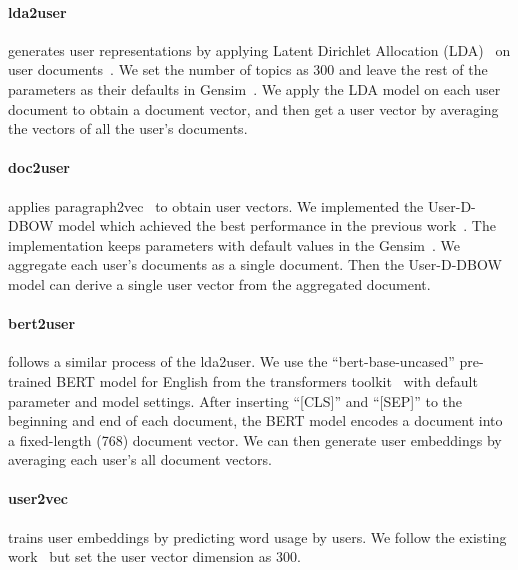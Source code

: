 \paragraph{lda2user} 
generates user representations by applying Latent Dirichlet Allocation (LDA)~\cite{blei2003latent} on user documents~\cite{pennacchiotti2011machine}. We set the number of topics as 300 and leave the rest of the parameters as their defaults in  Gensim~\cite{rehurek2010software}. We apply the LDA model on each user document to obtain a document vector, and then get a user vector by averaging the vectors of all the user's documents.


\paragraph{doc2user} 
applies paragraph2vec~\cite{le2014distributed} to obtain user vectors. We implemented the User-D-DBOW model which achieved the best performance in the previous work~\cite{ding2017multi}. The implementation keeps parameters with default values in the Gensim~\cite{rehurek2010software}. We aggregate each user's documents as a single document. Then the User-D-DBOW model can derive a single user vector from the aggregated document.

\paragraph{bert2user} 
follows a similar process of the lda2user. We use the ``bert-base-uncased'' pre-trained BERT model
for English from the transformers toolkit~\cite{Wolf2019HuggingFacesTS} with default parameter and model settings. After inserting ``[CLS]'' and ``[SEP]'' to the beginning and end of each document, the BERT model encodes a document into a fixed-length (768) document vector. We can then generate user embeddings by averaging each user's all document vectors.


\paragraph{user2vec} trains user embeddings by predicting word usage by users.
We follow the existing work~\cite{amir2017quantifying} but set the user vector dimension as 300.


